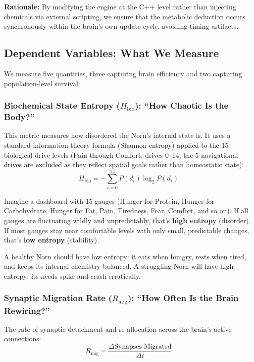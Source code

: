 \documentclass[12pt, a4paper]{article}
\newcommand{\Hbio}{H_{\mathrm{bio}}}
\newcommand{\Rmig}{R_{\mathrm{mig}}}
\begin{document}
\noindent\textbf{Rationale:} By modifying the engine at the C++ level rather than injecting chemicals via external scripting, we ensure that the metabolic deduction occurs synchronously within the brain's own update cycle, avoiding timing artifacts.

\subsection{Dependent Variables: What We Measure}
\label{sec:dv}

We measure five quantities, three capturing brain efficiency and two capturing population-level survival:

\subsubsection{Biochemical State Entropy ($\Hbio$): ``How Chaotic Is the Body?''}
This metric measures how disordered the Norn's internal state is. It uses a standard information theory formula (Shannon entropy) applied to the 15 biological drive levels (Pain through Comfort, drives 0--14; the 5 navigational drives are excluded as they reflect spatial goals rather than homeostatic state):
\begin{equation}
  \Hbio = -\sum_{i=0}^{14} P(d_i) \log_2 P(d_i)
  \label{eq:Hbio}
\end{equation}

\begin{plainbox}
Imagine a dashboard with 15 gauges (Hunger for Protein, Hunger for Carbohydrate, Hunger for Fat, Pain, Tiredness, Fear, Comfort, and so on). If all gauges are fluctuating wildly and unpredictably, that's \textbf{high entropy} (disorder). If most gauges stay near comfortable levels with only small, predictable changes, that's \textbf{low entropy} (stability).

A healthy Norn should have low entropy: it eats when hungry, rests when tired, and keeps its internal chemistry balanced. A struggling Norn will have high entropy: its needs spike and crash erratically.
\end{plainbox}

\subsubsection{Synaptic Migration Rate ($\Rmig$): ``How Often Is the Brain Rewiring?''}
The rate of synaptic detachment and re-allocation across the brain's active connections:
\begin{equation}
  \Rmig = \frac{\Delta \text{Synapses Migrated}}{\Delta t}
  \label{eq:Rmig}
\end{equation}
\end{document}
